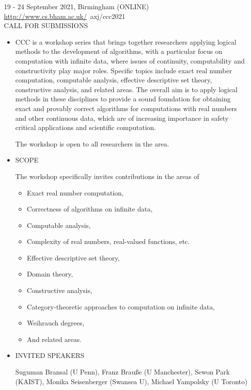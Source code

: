 \documentclass[prodmode,acmtecs]{acmsmall} %
\begin{document}
  19 - 24 September 2021, Birmingham (ONLINE)\\ 
  \href{http://www.cs.bham.ac.uk/}{http://www.cs.bham.ac.uk/}~axj/ccc2021\\ 
CALL FOR SUBMISSIONS 

\begin{itemize}\item  CCC is a workshop series that brings together researchers applying logical methods to the development of algorithms, with a particular focus on computation with infinite data, where issues of continuity, computability and constructivity play major roles. Specific topics include exact real number computation, computable analysis, effective descriptive set theory, constructive analysis, and related areas. The overall aim is to apply logical methods in these disciplines to provide a sound foundation for obtaining exact and provably correct algorithms for computations with real numbers and other continuous data, which are of increasing importance in safety critical applications and scientific computation. 
 
  The workshop is open to all researchers in the area. 
 
\item  SCOPE  
 
  The workshop specifically invites contributions in the areas of 
 
\begin{itemize}\item  Exact real number computation,
\item  Correctness of algorithms on infinite data,
\item  Computable analysis,
\item  Complexity of real numbers, real-valued functions, etc.
\item  Effective descriptive set theory,
\item  Domain theory,
\item  Constructive analysis,
\item  Category-theoretic approaches to computation on infinite data,
\item  Weihrauch degrees,
\item  And related areas.  
\end{itemize} 
\item  INVITED SPEAKERS 
 
  Suguman Bransal (U Penn), Franz Brauße (U Manchester), Sewon Park (KAIST), Monika Seisenberger (Swansea U), Michael Yampolsky (U Toronto) 
 

\end{itemize}
\end{document}
